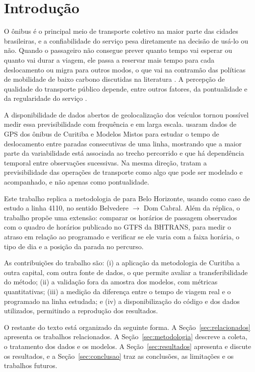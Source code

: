\section{Introdução}

O ônibus é o principal meio de transporte coletivo na maior parte das cidades brasileiras, e a
confiabilidade do serviço pesa diretamente na decisão de usá-lo ou não. Quando o passageiro não
consegue prever quanto tempo vai esperar ou quanto vai durar a viagem, ele passa a reservar
mais tempo para cada deslocamento ou migra para outros modos, o que vai na contramão das
políticas de mobilidade de baixo carbono discutidas na literatura \cite{WIMBADI2021103023}.
A percepção de qualidade do transporte público depende, entre outros fatores, da pontualidade e
da regularidade do serviço \cite{https://doi.org/10.1002/atr.106}.

A disponibilidade de dados abertos de geolocalização dos veículos tornou possível medir essa
previsibilidade com frequência e em larga escala. \cite{courb} usaram
dados de GPS dos ônibus de Curitiba e Modelos Mistos para estudar o tempo de deslocamento entre
paradas consecutivas de uma linha, mostrando que a maior parte da variabilidade está associada
ao trecho percorrido e que há dependência temporal entre observações sucessivas. Na mesma
direção, \cite{10.1109/TITS.2022.3145243} tratam a
previsibilidade das operações de transporte como algo que pode ser modelado e acompanhado, e
não apenas como pontualidade.

Este trabalho replica a metodologia de \cite{courb} para Belo Horizonte,
usando como caso de estudo a linha 4110, no sentido Belvedere $\rightarrow$ Dom Cabral. Além
da réplica, o trabalho propõe uma extensão: comparar os horários de passagem observados com o
quadro de horários publicado no GTFS da BHTRANS, para medir o atraso em relação ao programado e
verificar se ele varia com a faixa horária, o tipo de dia e a posição da parada no percurso.

As contribuições do trabalho são: (i) a aplicação da metodologia de Curitiba a outra capital,
com outra fonte de dados, o que permite avaliar a transferibilidade do método; (ii) a
validação fora da amostra dos modelos, com métricas quantitativas; (iii) a medição da
diferença entre o tempo de viagem real e o programado na linha estudada; e (iv) a
disponibilização do código e dos dados utilizados, permitindo a reprodução dos resultados.

O restante do texto está organizado da seguinte forma. A Seção~\ref{sec:relacionados}
apresenta os trabalhos relacionados. A Seção~\ref{sec:metodologia} descreve a coleta, o
tratamento dos dados e os modelos. A Seção~\ref{sec:resultados} apresenta e discute os
resultados, e a Seção~\ref{sec:conclusao} traz as conclusões, as limitações e os trabalhos
futuros.
